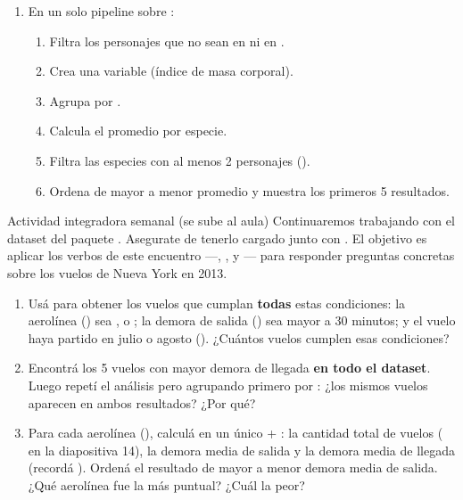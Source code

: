 \documentclass[8pt]{beamer}
\begin{document}
\begin{frame}[fragile]
\begin{enumerate}[start=31]
\item En un solo pipeline sobre :
\begin{enumerate}
	\item Filtra los personajes que no sean  en  ni en .
	\item Crea una variable  (índice de masa corporal).
	\item Agrupa por .
	\item Calcula el  promedio por especie.
	\item Filtra las especies con al menos 2 personajes ().
	\item Ordena de mayor a menor  promedio y muestra los primeros 5 resultados.
\end{enumerate}
\end{enumerate}
\end{frame}






\begin{frame}[fragile]{Actividad integradora semanal (se sube al aula)}
	Continuaremos trabajando con el dataset  del paquete . Asegurate de tenerlo cargado junto con . El objetivo es aplicar los verbos de este encuentro —, ,  y — para responder preguntas concretas sobre los vuelos de Nueva York en 2013.

	\begin{enumerate}
		\item Usá  para obtener los vuelos que cumplan \textbf{todas} estas condiciones: la aerolínea () sea ,  o ; la demora de salida () sea mayor a 30 minutos; y el vuelo haya partido en julio o agosto (). ¿Cuántos vuelos cumplen esas condiciones?

		\item Encontrá los 5 vuelos con mayor demora de llegada \textbf{en todo el dataset}. Luego repetí el análisis pero agrupando primero por : ¿los mismos vuelos aparecen en ambos resultados? ¿Por qué?

		\item Para cada aerolínea (), calculá en un único  + : la cantidad total de vuelos ( en la diapositiva 14), la demora media de salida y la demora media de llegada (recordá ). Ordená el resultado de mayor a menor demora media de salida. ¿Qué aerolínea fue la más puntual? ¿Cuál la peor?
	\end{enumerate}
\end{frame}
\end{document}
